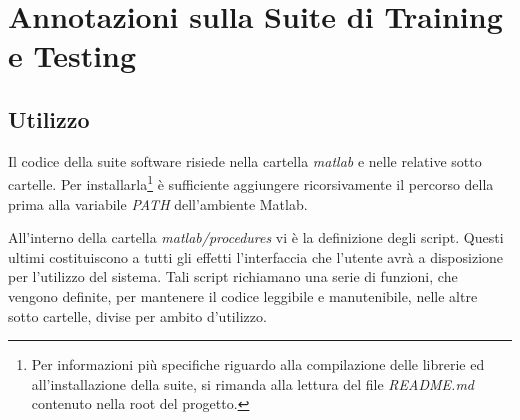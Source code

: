 \chapter{Annotazioni sulla Suite di Training e Testing}
    \section{Utilizzo} %
    \label{sec:utilizzo}
        Il codice della suite software risiede nella cartella \emph{matlab} e nelle relative sotto cartelle.
        Per installarla\footnote{Per informazioni più specifiche riguardo alla compilazione delle librerie ed all'installazione della suite, si rimanda alla lettura del file \emph{README.md} contenuto nella root del progetto.} è sufficiente aggiungere ricorsivamente il percorso della prima alla variabile \emph{PATH} dell'ambiente Matlab.

        All'interno della cartella \emph{matlab/procedures} vi è la definizione degli script.
        Questi ultimi costituiscono a tutti gli effetti l'interfaccia che l'utente avrà a disposizione per l'utilizzo del sistema.
        Tali script richiamano una serie di funzioni, che vengono definite, per mantenere il codice leggibile e manutenibile, nelle altre sotto cartelle, divise per ambito d'utilizzo.

